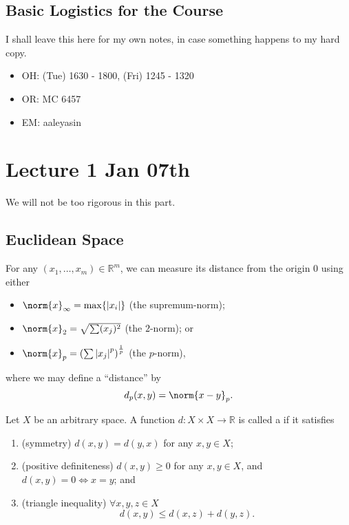 \documentclass[notoc,notitlepage]{tufte-book}
\begin{document}
\section*{Basic Logistics for the Course}%

I shall leave this here for my own notes, in case something happens to my hard copy.

\begin{itemize}
  \item OH: (Tue) 1630 - 1800, (Fri) 1245 - 1320
  \item OR: MC 6457
  \item EM: aaleyasin
\end{itemize}




\chapter{Lecture 1 Jan 07th}%
\label{chp:lecture_1_jan_07th}
\nocite{johnlee2000}

We will not be too rigorous in this part.

\section{Euclidean Space}%
\label{sec:euclidean_space}

For any $(x_1, \ldots, x_m) \in \mathbb{R}^m$, we can measure its distance from the origin $0$ using either
\begin{itemize}
  \item $\norm{x}_\infty = \max \{ \abs{ x_i } \}$ (the supremum-norm);
  \item $\norm{x}_2 = \sqrt{ \sum (x_j)^2 }$ (the $2$-norm); or
  \item $\norm{x}_p = \left( \sum \abs{ x_j }^p \right)^\frac{1}{p}$ (the $p$-norm),
\end{itemize}
where we may define a ``distance'' by
\begin{equation*}
  d_p(x, y) = \norm{ x - y }_p.
\end{equation*}

\begin{defn}[Metric]\label{defn:metric}
  Let $X$ be an arbitrary space. A function $d : X \times X \to \mathbb{R}$ is called a  if it satisfies
  \begin{enumerate}
    \item (symmetry) $d(x, y) = d(y, x)$ for any $x, y \in X$;
    \item (positive definiteness) $d(x, y) \geq 0$ for any $x, y \in X$, and $d(x, y) = 0 \iff x = y$; and
    \item (triangle inequality) $\forall x, y, z \in X$
      \begin{equation*}
        d(x, y) \leq d(x, z) + d(y, z).
      \end{equation*}
  \end{enumerate}
\end{defn}
\end{document}
